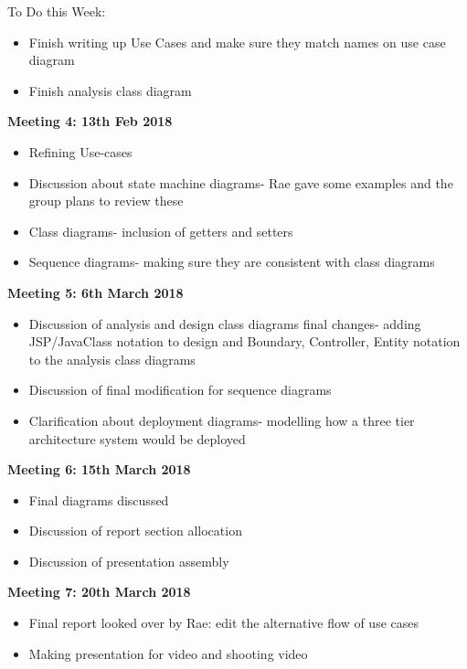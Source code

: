 To Do this Week:
\begin{itemize}
  \item Finish writing up Use Cases and make sure they match names on use case diagram
  \item Finish analysis class diagram

\end{itemize}

\textbf{Meeting 4: 13th Feb 2018}

\begin{itemize}
  \item Refining Use-cases
  \item Discussion about state machine diagrams- Rae gave some examples and the group plans to review these
  \item Class diagrams- inclusion of getters and setters
  \item Sequence diagrams- making sure they are consistent with class diagrams


\end{itemize}

\textbf{Meeting 5: 6th March 2018}

\begin{itemize}
	\item Discussion of analysis and design class diagrams final changes- adding JSP/JavaClass notation to design and Boundary, Controller, Entity notation to the analysis class diagrams
	\item Discussion of final modification for sequence diagrams
	\item Clarification about deployment diagrams- modelling how a three tier architecture system would be deployed

\end{itemize}

\textbf{Meeting 6: 15th March 2018}

\begin{itemize}
	\item Final diagrams discussed 
	\item Discussion of report section allocation
	\item Discussion of presentation assembly

\end{itemize}

\textbf{Meeting 7: 20th March 2018}

\begin{itemize}
  \item Final report looked over by Rae: edit the alternative flow of use cases
  \item Making presentation for video and shooting video 

\end{itemize}

